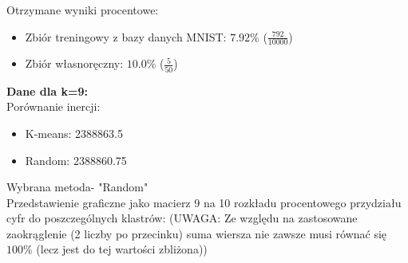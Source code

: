 \documentclass[a4paper,14pt]{report}
\begin{document}
	Otrzymane wyniki procentowe:
	\begin{itemize}
		\item Zbiór treningowy z bazy danych MNIST: $7.92\%$ ($\frac{792}{10000}$)
		\item Zbiór własnoręczny: $10.0\%$ ($\frac{5}{50}$)
	\end{itemize}
	\textbf{Dane dla k=9: } \\
	Porównanie inercji: 
	\begin{itemize}
		\item K-means: 2388863.5
		\item Random: 2388860.75
	\end{itemize}
	Wybrana metoda- "Random" \\
	Przedstawienie graficzne jako macierz 9 na 10 rozkładu procentowego przydziału cyfr do poszczególnych klastrów:
	(UWAGA: Ze względu na zastosowane zaokrąglenie (2 liczby po przecinku) suma wiersza nie zawsze musi równać się $100\%$ (lecz jest do tej wartości zbliżona))
\end{document}
